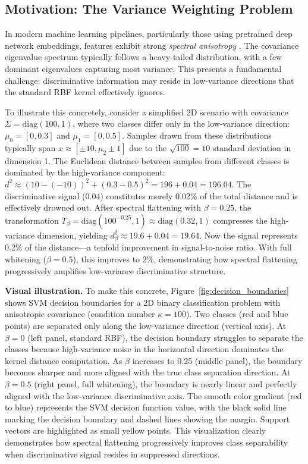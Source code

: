 \documentclass[11pt]{article}
\begin{document}
\subsection{Motivation: The Variance Weighting Problem}

In modern machine learning pipelines, particularly those using pretrained deep network embeddings, features exhibit strong \emph{spectral anisotropy} \cite{papyan2020prevalence}. The covariance eigenvalue spectrum typically follows a heavy-tailed distribution, with a few dominant eigenvalues capturing most variance. This presents a fundamental challenge: discriminative information may reside in low-variance directions that the standard RBF kernel effectively ignores.

To illustrate this concretely, consider a simplified 2D scenario with covariance $\Sigma = \text{diag}(100, 1)$, where two classes differ only in the low-variance direction: $\mu_0 = [0, 0.3]$ and $\mu_1 = [0, 0.5]$. Samples drawn from these distributions typically span $x \approx [\pm 10, \mu_2 \pm 1]$ due to the $\sqrt{100}=10$ standard deviation in dimension 1. The Euclidean distance between samples from different classes is dominated by the high-variance component: $d^2 \approx (10-(-10))^2 + (0.3-0.5)^2 = 196 + 0.04 = 196.04$. The discriminative signal (0.04) constitutes merely 0.02\% of the total distance and is effectively drowned out. After spectral flattening with $\beta=0.25$, the transformation $T_\beta = \text{diag}(100^{-0.25}, 1) \approx \text{diag}(0.32, 1)$ compresses the high-variance dimension, yielding $d^2_\beta \approx 19.6 + 0.04 = 19.64$. Now the signal represents 0.2\% of the distance---a tenfold improvement in signal-to-noise ratio. With full whitening ($\beta=0.5$), this improves to 2\%, demonstrating how spectral flattening progressively amplifies low-variance discriminative structure.

\textbf{Visual illustration.} To make this concrete, Figure~\ref{fig:decision_boundaries} shows SVM decision boundaries for a 2D binary classification problem with anisotropic covariance (condition number $\kappa=100$). Two classes (red and blue points) are separated only along the low-variance direction (vertical axis). At $\beta=0$ (left panel, standard RBF), the decision boundary struggles to separate the classes because high-variance noise in the horizontal direction dominates the kernel distance computation. As $\beta$ increases to 0.25 (middle panel), the boundary becomes sharper and more aligned with the true class separation direction. At $\beta=0.5$ (right panel, full whitening), the boundary is nearly linear and perfectly aligned with the low-variance discriminative axis. The smooth color gradient (red to blue) represents the SVM decision function value, with the black solid line marking the decision boundary and dashed lines showing the margin. Support vectors are highlighted as small yellow points. This visualization clearly demonstrates how spectral flattening progressively improves class separability when discriminative signal resides in suppressed directions.
\end{document}
